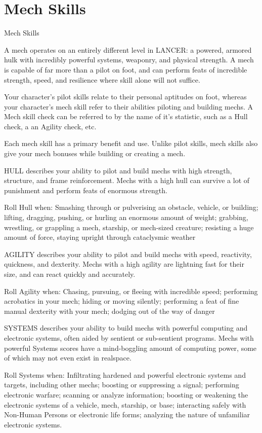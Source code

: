 \section{Mech Skills}
                                                  Mech Skills

A mech operates on an entirely different level in LANCER: a powered, armored hulk with
incredibly powerful systems, weaponry, and physical strength. A mech is capable of far more than
a pilot on foot, and can perform feats of incredible strength, speed, and resilience where skill
alone will not suffice.

Your character’s pilot skills relate to their personal aptitudes on foot, whereas your character’s
mech skill refer to their abilities piloting and building mechs. A Mech skill check can be referred to
by the name of it’s statistic, such as a Hull check, a an Agility check, etc.

Each mech skill has a primary benefit and use. Unlike pilot skills, mech skills also give your mech
bonuses while building or creating a mech.

HULL describes your ability to pilot and build mechs with high strength, structure, and frame
reinforcement. Mechs with a high hull can survive a lot of punishment and perform feats of
enormous strength.

Roll Hull when: Smashing through or pulverising an obstacle, vehicle, or building; lifting, dragging,
pushing, or hurling an enormous amount of weight; grabbing, wrestling, or grappling a mech,
starship, or mech-sized creature; resisting a huge amount of force, staying upright through
cataclysmic weather

AGILITY describes your ability to pilot and build mechs with speed, reactivity, quickness, and
dexterity. Mechs with a high agility are lightning fast for their size, and can react quickly and
accurately.

Roll Agility when: Chasing, pursuing, or fleeing with incredible speed; performing acrobatics in
your mech; hiding or moving silently; performing a feat of fine manual dexterity with your mech;
dodging out of the way of danger

SYSTEMS describes your ability to build mechs with powerful computing and electronic systems,
often aided by sentient or sub-sentient programs. Mechs with powerful Systems scores have a
mind-boggling amount of computing power, some of which may not even exist in realspace.

Roll Systems when: Infiltrating hardened and powerful electronic systems and targets, including
other mechs; boosting or suppressing a signal; performing electronic warfare; scanning or analyze
information; boosting or weakening the electronic systems of a vehicle, mech, starship, or base;
interacting safely with Non-Human Persons or electronic life forms; analyzing the nature of
unfamiliar electronic systems.




